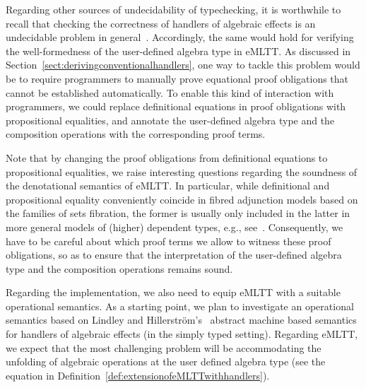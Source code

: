 Regarding other sources of undecidability of typechecking, it is worthwhile to recall that checking the correctness of handlers of algebraic effects is an undecidable problem in general~\cite[\S6]{Plotkin:HandlingEffects}. Accordingly, the same would hold for verifying the well-formedness of the user-defined algebra type in eMLTT.
As discussed in Section~\ref{sect:derivingconventionalhandlers}, one way to tackle this problem would be  
to require  
programmers to manually prove equational proof obligations that cannot be established automatically. 
To enable this kind of interaction with programmers, we could replace definitional equations in proof obligations with propositional equalities, and annotate the user-defined algebra type and the composition operations with the corresponding proof terms. 

Note that by changing the proof obligations from definitional equations to propositional equalities, we raise interesting questions regarding the soundness of the denotational semantics of eMLTT. In particular, while definitional and propositional equality conveniently coincide in fibred adjunction models based on the families of sets fibration, the former is usually only included in the latter in more general models of (higher) dependent types, e.g., see~\cite{Bezem:Cubical}. 
Consequently, we have to be careful about which proof terms we allow to witness these proof obligations, so as to ensure that the interpretation of the user-defined algebra type and the composition operations remains sound.

Regarding the implementation, we also need to equip eMLTT 
with a suitable operational semantics. As a starting point, we plan to investigate an operational semantics  based on Lindley and Hillerstr\"{o}m's~\cite{Hillerstrom:Liberating} abstract machine based semantics for handlers of algebraic effects (in the simply typed setting). 
Regarding eMLTT, we expect that the most challenging problem will be accommodating the unfolding of algebraic operations at the user defined algebra type (see the equation in Definition~\ref{def:extensionofeMLTTwithhandlers}).





















